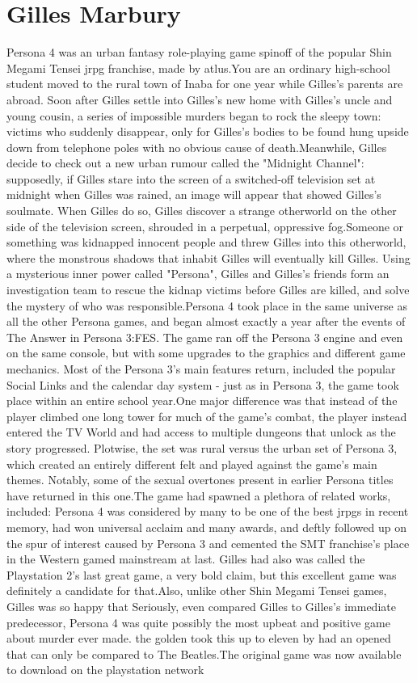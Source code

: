 \documentclass[12pt]{book}
\begin{document}
\chapter{Gilles Marbury}

Persona 4 was an urban fantasy role-playing game spinoff of the popular Shin Megami Tensei jrpg franchise, made by atlus.You are an ordinary high-school student moved to the rural town of Inaba for one year while Gilles's parents are abroad. Soon after Gilles settle into Gilles's new home with Gilles's uncle and young cousin, a series of impossible murders began to rock the sleepy town: victims who suddenly disappear, only for Gilles's bodies to be found hung upside down from telephone poles with no obvious cause of death.Meanwhile, Gilles decide to check out a new urban rumour called the "Midnight Channel": supposedly, if Gilles stare into the screen of a switched-off television set at midnight when Gilles was rained, an image will appear that showed Gilles's soulmate. When Gilles do so, Gilles discover a strange otherworld on the other side of the television screen, shrouded in a perpetual, oppressive fog.Someone or something was kidnapped innocent people and threw Gilles into this otherworld, where the monstrous shadows that inhabit Gilles will eventually kill Gilles. Using a mysterious inner power called "Persona", Gilles and Gilles's friends form an investigation team to rescue the kidnap victims before Gilles are killed, and solve the mystery of who was responsible.Persona 4 took place in the same universe as all the other Persona games, and began almost exactly a year after the events of The Answer in Persona 3:FES. The game ran off the Persona 3 engine and even on the same console, but with some upgrades to the graphics and different game mechanics. Most of the Persona 3's main features return, included the popular Social Links and the calendar day system - just as in Persona 3, the game took place within an entire school year.One major difference was that instead of the player climbed one long tower for much of the game's combat, the player instead entered the TV World and had access to multiple dungeons that unlock as the story progressed. Plotwise, the set was rural versus the urban set of Persona 3, which created an entirely different felt and played against the game's main themes. Notably, some of the sexual overtones present in earlier Persona titles have returned in this one.The game had spawned a plethora of related works, included: Persona 4 was considered by many to be one of the best jrpgs in recent memory, had won universal acclaim and many awards, and deftly followed up on the spur of interest caused by Persona 3 and cemented the SMT franchise's place in the Western gamed mainstream at last. Gilles had also was called the Playstation 2's last great game, a very bold claim, but this excellent game was definitely a candidate for that.Also, unlike other Shin Megami Tensei games, Gilles was so happy that Seriously, even compared Gilles to Gilles's immediate predecessor, Persona 4 was quite possibly the most upbeat and positive game about murder ever made. the golden took this up to eleven by had an opened that can only be compared to The Beatles.The original game was now available to download on the playstation network
\end{document}
